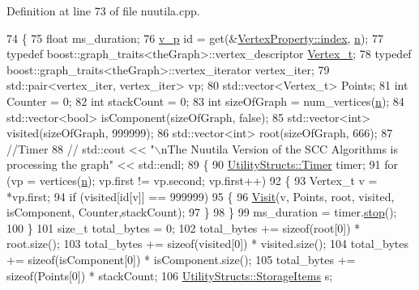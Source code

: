 Definition at line 73 of file nuutila.\+cpp.


\begin{DoxyCode}
74 \{
75     \textcolor{keywordtype}{float} ms\_duration;
76     \hyperlink{utilities_8h_a3f4959b3d837fa6351a9414c79280286}{v\_p} \textcolor{keywordtype}{id} = \textcolor{keyword}{get}(&\hyperlink{struct_utility_structs_1_1_vertex_property_a636cb729438e999aa3d9a17ac39d8641}{VertexProperty::index}, \hyperlink{class_nuutila_a1409929fa0f38709497f8bdb012af71c}{n});
77     \textcolor{keyword}{typedef} boost::graph\_traits<theGraph>::vertex\_descriptor \hyperlink{class_graph_component_ae67114a6ce5a001dc35e1996e1b45aa0}{Vertex\_t};
78     \textcolor{keyword}{typedef} boost::graph\_traits<theGraph>::vertex\_iterator vertex\_iter;
79     std::pair<vertex\_iter, vertex\_iter> vp;
80     std::vector<Vertex\_t> Points;
81     \textcolor{keywordtype}{int} Counter = 0;
82     \textcolor{keywordtype}{int} stackCount = 0;
83     \textcolor{keywordtype}{int} sizeOfGraph = num\_vertices(\hyperlink{class_nuutila_a1409929fa0f38709497f8bdb012af71c}{n});
84     std::vector<bool> isComponent(sizeOfGraph, \textcolor{keyword}{false});
85     std::vector<int> visited(sizeOfGraph, 999999);
86     std::vector<int> root(sizeOfGraph, 666);
87     \textcolor{comment}{//Timer}
88     \textcolor{comment}{//   std::cout << "\(\backslash\)nThe Nuutila Version of the SCC Algorithms is processing the graph" << std::endl;}
89     \{
90         \hyperlink{class_utility_structs_1_1_timer}{UtilityStructs::Timer} timer;
91         \textcolor{keywordflow}{for} (vp = vertices(\hyperlink{class_nuutila_a1409929fa0f38709497f8bdb012af71c}{n}); vp.first != vp.second; vp.first++)
92         \{
93             Vertex\_t v = *vp.first;
94             \textcolor{keywordflow}{if} (visited[\textcolor{keywordtype}{id}[v]] == 999999)
95             \{
96                 \hyperlink{class_nuutila_a2d43bc514d7375f9d63e60c06f90a60f}{Visit}(v, Points, root, visited, isComponent, Counter,stackCount);
97             \}
98         \}
99         ms\_duration = timer.\hyperlink{class_utility_structs_1_1_timer_a12f62b57c263d563efd6089cff52355f}{stop}();
100     \}
101     \textcolor{keywordtype}{size\_t} total\_bytes = 0;
102     total\_bytes += \textcolor{keyword}{sizeof}(root[0]) * root.size();
103     total\_bytes += \textcolor{keyword}{sizeof}(visited[0]) * visited.size();
104     total\_bytes += \textcolor{keyword}{sizeof}(isComponent[0]) * isComponent.size();
105     total\_bytes += \textcolor{keyword}{sizeof}(Points[0]) * stackCount;
106     \hyperlink{struct_utility_structs_1_1_storage_items}{UtilityStructs::StorageItems} s;

\end{DoxyCode}
